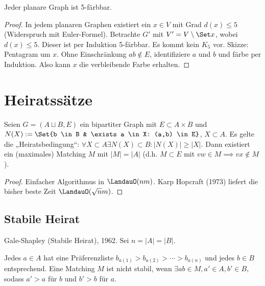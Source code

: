 \begin{st}
    Jeder planare Graph ist 5-färbbar.
    \begin{proof}
        In jedem planaren Graphen existiert ein $x \in V$ mit Grad $d(x) \le 5$ (Widerspruch mit Euler-Formel).
        Betrachte $G'$ mit $V' = V \setminus \Set x$, wobei $d(x) \le 5$.
        Dieser ist per Induktion 5-färbbar.
        Es kommt kein $K_5$ vor. Skizze: Pentagram um $x$.
        Ohne Einschränkung $ab \not\in E$, identifiziere $a$ und $b$ und färbe per Induktion.
        Also kann $x$ die verbleibende Farbe erhalten.
    \end{proof}
\end{st}



\section{Heiratssätze}

\begin{st}
    Seien $G = (A \sqcup B, E)$ ein bipartiter Graph mit $E \subset A \times B$ und $N(X) := \Set{b \in B & \exists a \in X: (a,b) \in E}$, $X \subset A$.
    Es gelte die „Heiratsbedingung“:
    \begin{math}
        \forall X \subset A \exists N(X) \subset B : |N(X)| \ge |X|.
    \end{math}
    Dann existiert ein (maximales) Matching $M$ mit $|M| = |A|$ (d.h. $M \subset E$ mit $vw \in M \implies vx \not\in M$).
    \begin{proof}
        Einfacher Algorithmus in $\LandauO(nm)$.
        Karp Hopcraft (1973) liefert die bisher beste Zeit $\LandauO(\sqrt{n} m)$.
    \end{proof}
\end{st}

\subsection{Stabile Heirat}

Gale-Shapley (Stabile Heirat), 1962.
Sei $n = |A| = |B|$.

Jedes $a \in A$ hat eine Präferenzliste $b_{a(1)} > b_{a(2)} > \dotsb > b_{a(n)}$ und jedes $b \in B$ entsprechend.
Eine Matching $M$ ist nicht stabil, wenn $\exists ab \in M, a' \in A, b' \in B$, sodass $a' > a$ für $b$ und $b' > b$ für $a$.

